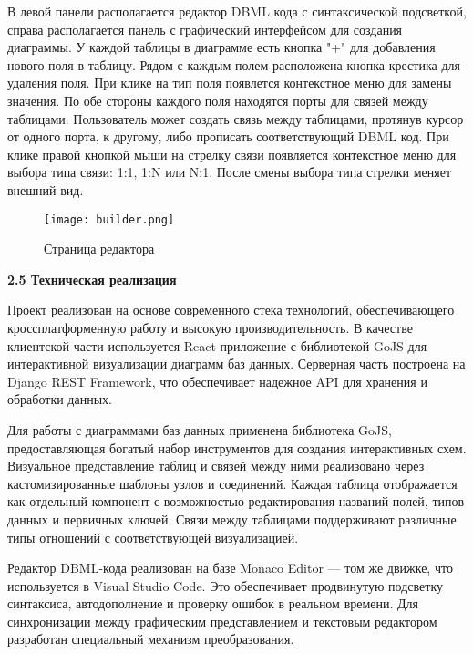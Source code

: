 В левой панели располагается редактор DBML кода с синтаксической подсветкой, справа располагается панель с графический интерфейсом для создания диаграммы. У каждой таблицы в диаграмме есть кнопка "+" для добавления нового поля в таблицу. Рядом с каждым полем расположена кнопка крестика для удаления поля. При клике на тип поля появлется контекстное меню для замены значения. По обе стороны каждого поля находятся порты для связей между таблицами. Пользователь может создать связь между таблицами, протянув курсор от одного порта, к другому, либо прописать соответствующий DBML код. При клике правой кнопкой мыши на стрелку связи появляется контекстное меню для выбора типа связи: 1:1, 1:N или N:1. После смены выбора типа стрелки меняет внешний вид.
    
\renewcommand{\figurename}{Рисунок}
\begin{figure}[htbp]
    \centering %
    \texttt{[image: builder.png]}
    \caption{Страница редактора}
    \label{fig:analyze} %
\end{figure}

\textbf{\large 2.5 Техническая реализация}

Проект реализован на основе современного стека технологий, обеспечивающего кроссплатформенную работу и высокую производительность. В качестве клиентской части используется React-приложение с библиотекой GoJS для интерактивной визуализации диаграмм баз данных. Серверная часть построена на Django REST Framework, что обеспечивает надежное API для хранения и обработки данных.

Для работы с диаграммами баз данных применена библиотека GoJS, предоставляющая богатый набор инструментов для создания интерактивных схем. Визуальное представление таблиц и связей между ними реализовано через кастомизированные шаблоны узлов и соединений. Каждая таблица отображается как отдельный компонент с возможностью редактирования названий полей, типов данных и первичных ключей. Связи между таблицами поддерживают различные типы отношений с соответствующей визуализацией.

Редактор DBML-кода реализован на базе Monaco Editor — том же движке, что используется в Visual Studio Code. Это обеспечивает продвинутую подсветку синтаксиса, автодополнение и проверку ошибок в реальном времени. Для синхронизации между графическим представлением и текстовым редактором разработан специальный механизм преобразования.

